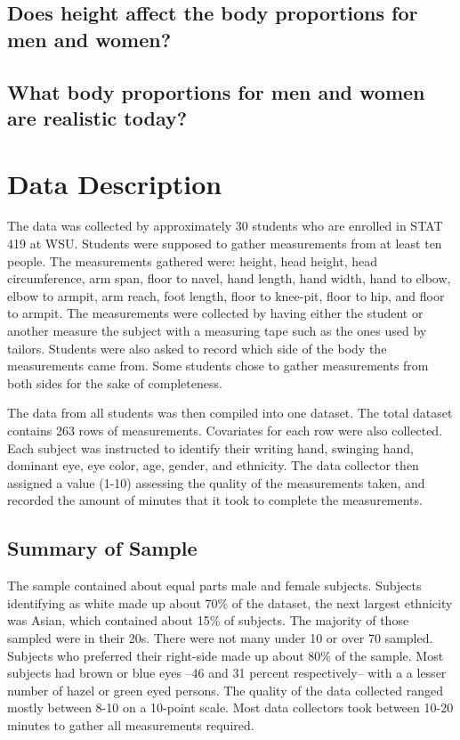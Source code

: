 \documentclass[]{article}
\begin{document}
\subsection{Does height affect the body proportions for men and women?}
\label{sec:rq2}

\subsection{What body proportions for men and women are realistic today?}
\label{sec:rq3}

\section{Data Description}
\label{sec:data}

The data was collected by approximately 30 students who are enrolled in
STAT 419 at WSU. Students were supposed to gather measurements from at
least ten people. The measurements gathered were: height, head height,
head circumference, arm span, floor to navel, hand length, hand width,
hand to elbow, elbow to armpit, arm reach, foot length, floor to
knee-pit, floor to hip, and floor to armpit. The measurements were
collected by having either the student or another measure the subject
with a measuring tape such as the ones used by tailors. Students were
also asked to record which side of the body the measurements came from.
Some students chose to gather measurements from both sides for the sake
of completeness.

The data from all students was then compiled into one dataset. The total
dataset contains 263 rows of measurements. Covariates for each row were
also collected. Each subject was instructed to identify their writing
hand, swinging hand, dominant eye, eye color, age, gender, and
ethnicity. The data collector then assigned a value (1-10) assessing the
quality of the measurements taken, and recorded the amount of minutes
that it took to complete the measurements.

\subsection{Summary of Sample}
\label{sec:data-sample}

The sample contained about equal parts male and female subjects.
Subjects identifying as white made up about 70\% of the dataset, the
next largest ethnicity was Asian, which contained about 15\% of
subjects. The majority of those sampled were in their 20s. There were
not many under 10 or over 70 sampled. Subjects who preferred their
right-side made up about 80\% of the sample. Most subjects had brown or
blue eyes --46 and 31 percent respectively-- with a a lesser number of
hazel or green eyed persons. The quality of the data collected ranged
mostly between 8-10 on a 10-point scale. Most data collectors took
between 10-20 minutes to gather all measurements required.
\end{document}
